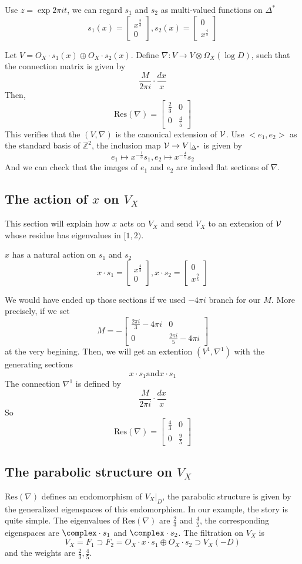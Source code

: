 \documentclass{article}
\renewcommand{\vector}[2]{
\left[\begin{array}{c}
    {#1} \\
    {#2}
    \end{array}\right]
}
\renewcommand{\matrix}[4]{
\left[\begin{array}{cc}
    {#1} & {#2} \\
    {#3} & {#4}
    \end{array}\right]
}
\begin{document}
Use $z = \exp{2\pi it}$, we can regard $s_1$ and $s_2$ as multi-valued functions on $\Delta^*$
\[
    s_1(x) = \vector{x^{\frac{2}{3}}}{0},
    s_2(x) = \vector{0}{x^{\frac{4}{5}}}
\]


Let $V = O_X\cdot s_1(x)\oplus O_X\cdot s_2(x)$.
Define $\nabla : V \rightarrow V\otimes\Omega_X(\log D)$, such that the connection matrix
is given by
\[
    \frac{M}{2\pi i}\cdot\frac{dx}{x}
\]
Then,
\[
    \text{Res}(\nabla) = \left[\begin{array}{cc}
                            \frac{2}{3} & 0 \\
                            0 & \frac{4}{5}
                            \end{array}\right]
\]
This verifies that the $(V, \nabla)$ is the canonical extension of $\mathcal{V}$.
Use $<e_1, e_2>$ as the standard basis of $\mathbb{Z}^2$, the inclusion map
$\mathcal{V} \rightarrow V|_{\Delta^*}$ is given by
\[
    e_1 \mapsto x^{-\frac{1}{3}}s_1, e_2 \mapsto x^{-\frac{4}{5}}s_2
\]
And we can check that the images of $e_1$ and $e_2$ are indeed flat sections of $\nabla$.


\subsection{The action of $x$ on $V_X$}
This section will explain how $x$ acts on $V_X$ and send $V_X$ to an extension of $\mathcal{V}$ whose
residue has eigenvalues in $[1, 2)$.

$x$ has a natural action on $s_1$ and $s_2$
\[
    x\cdot s_1 = \vector{x^{\frac{4}{3}}}{0},
    x\cdot s_2 = \vector{0}{x^{\frac{9}{5}}}
\]

We would have ended up those sections if we used $-4\pi i$ branch for our $M$. More precisely,
if we set 
\[
    M = - \matrix{\frac{2\pi i}{3} - 4\pi i}{0}{0}{\frac{2\pi i}{5} - 4\pi i}
\]
at the very begining. Then, we will get an extention $(V^1, \nabla^1)$ with the generating 
sections
\[
    x\cdot s_1 \text{and} x\cdot s_1
\]
The connection $\nabla^1$ is defined by
\[
    \frac{M}{2\pi i}\cdot\frac{dx}{x}
\]
So
\[
    \text{Res}(\nabla) = \matrix{\frac{4}{3}}{0}{0}{\frac{9}{5}}
\]

\subsection{The parabolic structure on $V_X$}
$\text{Res}(\nabla)$ defines an endomorphism of $V_X|_D$, the parabolic structure is given
by the generalized eigenspaces of this endomorphism. In our example, the story is quite 
simple. The eigenvalues of $\text{Res}(\nabla)$ are $\frac{2}{3}$ and $\frac{4}{5}$, 
the corresponding eigenspaces are $\complex\cdot s_1$ and $\complex\cdot s_2$. 
The filtration on $V_X$ is
\[
    V_X = F_1 \supset F_2 = O_X\cdot x\cdot s_1 \oplus O_X\cdot s_2 \supset V_X(-D)
\]
and the weights are $\frac{2}{3}, \frac{4}{5}$. 
\end{document}
